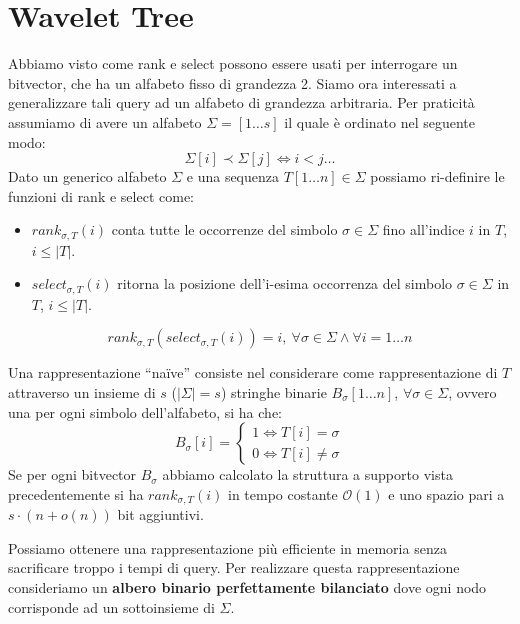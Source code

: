 \section{Wavelet Tree}
Abbiamo visto come rank e select possono essere usati per interrogare un bitvector,
che ha un alfabeto fisso di grandezza 2. Siamo ora interessati a generalizzare
tali query ad un alfabeto di grandezza arbitraria. Per praticità assumiamo di
avere un alfabeto $\Sigma = [1 \dots s]$ il quale è ordinato nel seguente modo:
\begin{equation}
    \Sigma[i] \prec \Sigma[j] \iff i < j \dots
\end{equation}
Dato un generico alfabeto $\Sigma$ e una sequenza $T[1\dots n] \in \Sigma$ possiamo
ri-definire le funzioni di rank e select come:
\begin{itemize}
    \item $rank_{\sigma,T} (i)$ conta tutte le occorrenze del simbolo $\sigma
              \in \Sigma$ fino all'indice $i$ in $T$, $i \leq | T |$.
    \item $select_{\sigma,T} (i)$ ritorna la posizione dell'i-esima occorrenza
          del simbolo $\sigma \in \Sigma$ in $T$, $i \leq | T |$.
\end{itemize}
\begin{equation}
    rank_{\sigma,T} (select_{\sigma,T} (i)) = i, \ \forall \sigma \in \Sigma
    \land \forall i = 1 \dots n
\end{equation}

Una rappresentazione ``naïve'' consiste nel considerare come rappresentazione di
$T$ attraverso un insieme di $s$ ($| \Sigma | = s$) stringhe binarie $B_\sigma[1
        \dots n]$, $\forall \sigma \in \Sigma$, ovvero una per ogni simbolo
dell'alfabeto, si ha che:
\begin{equation}
    B_\sigma[i] = \begin{cases}
        1 \iff T[i] = \sigma \\
        0 \iff T[i] \neq \sigma
    \end{cases}
\end{equation}
Se per ogni bitvector $B_\sigma$ abbiamo calcolato la struttura a supporto vista
precedentemente si ha $rank_{\sigma,T} (i)$ in tempo costante $\mathcal{O}(1)$ e
uno spazio pari a $s \cdot (n + o(n))$ bit aggiuntivi.

Possiamo ottenere una rappresentazione più efficiente in memoria senza sacrificare
troppo i tempi di query. Per realizzare questa rappresentazione consideriamo un
\textbf{albero binario perfettamente bilanciato} dove ogni nodo corrisponde ad un
sottoinsieme di $\Sigma$.

